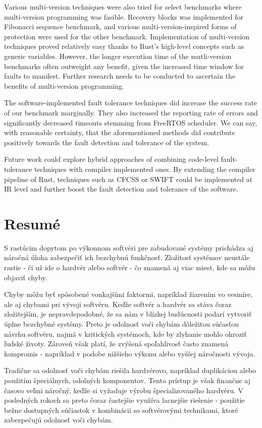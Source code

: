 \documentclass[12pt, letterpaper, slovak]{article}
\begin{document}
Various multi-version techniques were also tried for select benchmarks where multi-version programming was fasible. Recovery blocks was implemented for Fibonacci sequence benchmark, and various multi-version-inspired forms of protection were used for the other benchmark. Implementation of multi-version techniques proved relatively easy thanks to Rust's high-level concepts such as generic variables. However, the longer execution time of the mutli-version benchmarks often outweight any benefit, given the increased time window for faults to manifest. Further research needs to be conducted to ascertain the benefits of multi-version programming.

The software-implemented fault tolerance techniques did increase the success rate of our benchmark marginally. They also increased the reporting rate of errors and significantly decreased timeouts stemming from FreeRTOS scheduler. We can say, with reasonable certainty, that the aforementioned methods did contribute positively towards the fault detection and tolerance of the system.

Future work could explore hybrid approaches of combining code-level fault-tolerance techniques with compiler implemented ones. By extending the compiler pipeline of Rust, techniques such as CFCSS or SWIFT could be implemented at IR level and further boost the fault detection and tolerance of the software.



\clearpage
\section{Resumé}
S rastúcim dopytom po výkonnom softvéri pre zabudované systémy prichádza aj náročná úloha zabezpečiť ich bezchybnú funkčnosť. Zložitosť systémov neustále rastie - či už ide o hardvér alebo softvér - čo znamená aj viac miest, kde sa môžu objaviť chyby.

Chyby môžu byť spôsobené vonkajšími faktormi, napríklad žiarením vo vesmíre, ale aj chybami pri vývoji softvéru. Keďže softvér a hardvér sa stáva čoraz zložitejším, je nepravdepodobné, že sa nám v blízkej budúcnosti podarí vytvoriť úplne bezchybné systémy. Preto je odolnosť voči chybám dôležitou súčasťou návrhu softvéru, najmä v kritických systémoch, kde by zlyhanie mohlo ohroziť ľudské životy. Zároveň však platí, že zvýšená spoľahlivosť často znamená kompromis - napríklad v podobe nižšieho výkonu alebo vyššej náročnosti vývoja.

Tradične sa odolnosť voči chybám riešila hardvérovo, napríklad duplikáciou alebo použitím špeciálnych, odolných komponentov. Tento prístup je však finančne aj časovo veľmi náročný, keďže si vyžaduje výrobu špecializovaného hardvéru. V posledných rokoch sa preto čoraz častejšie využíva lacnejšie riešenie - použitie bežne dostupných súčiastok v kombinácii so softvérovými technikami, ktoré zabezpečujú odolnosť voči chybám.
\end{document}
